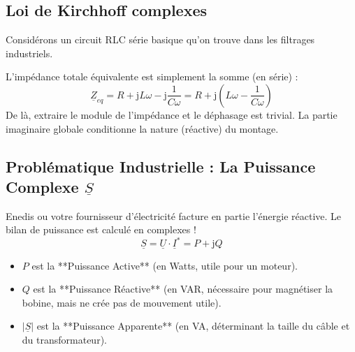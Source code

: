 \documentclass[11pt,a4paper]{article}
\newcommand{\jc}{\mathrm{j}} %
\newcommand{\cpx}[1]{\underline{#1}} %
\begin{document}
\subsection{Loi de Kirchhoff complexes}

Considérons un circuit RLC série basique qu'on trouve dans les filtrages industriels.

\begin{center}
\end{center}

L'impédance totale équivalente est simplement la somme (en série) :
\[ \cpx{Z}_{eq} = R + \jc L\omega - \jc \frac{1}{C\omega} = R + \jc\left(L\omega - \frac{1}{C\omega}\right) \]
De là, extraire le module de l'impédance et le déphasage est trivial. La partie imaginaire globale conditionne la nature (réactive) du montage.

\subsection{Problématique Industrielle : La Puissance Complexe $\cpx{S}$}
Enedis ou votre fournisseur d'électricité facture en partie l'énergie réactive. Le bilan de puissance est calculé en complexes !
\[ \cpx{S} = \cpx{U} \cdot \cpx{I}^* = P + \jc Q \]
\begin{itemize}
    \item $P$ est la **Puissance Active** (en Watts, utile pour un moteur).
    \item $Q$ est la **Puissance Réactive** (en VAR, nécessaire pour magnétiser la bobine, mais ne crée pas de mouvement utile).
    \item $|\cpx{S}|$ est la **Puissance Apparente** (en VA, déterminant la taille du câble et du transformateur).
\end{itemize}
\end{document}
